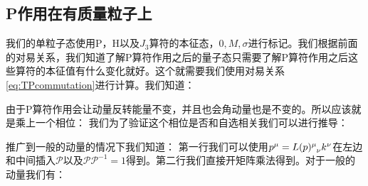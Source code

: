 \subsection{P作用在有质量粒子上}
我们的单粒子态使用P，H以及$ J_3 $算符的本征态，$ 0,M,\sigma $进行标记。我们根据前面的对易关系，我们知道了解P算符作用之后的量子态只需要了解P算符作用之后这些算符的本征值有什么变化就好。这个就需要我们使用对易关系\cref{eq:TPcommutation}进行计算。我们知道：

由于P算符作用会让动量反转能量不变，并且也会角动量也是不变的。所以应该就是乘上一个相位：
我们为了验证这个相位是否和自选相关我们可以进行推导：


推广到一般的动量的情况下我们知道：
第一行我们可以使用$ p^\mu = \tensor{L(p)}{^\mu_\nu}k^\nu $在左边和中间插入$ \mathscr{P} $以及$ \mathscr{P}\mathscr{P}^{-1} = 1 $得到。第二行我们直接开矩阵乘法得到。对于一般的动量我们有：


